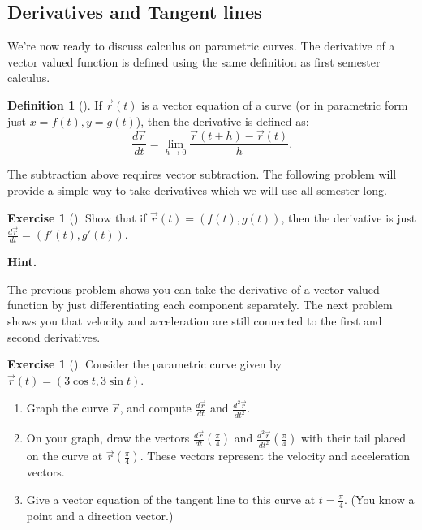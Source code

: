 \documentclass[10pt,]{book}
\theoremstyle{plain}
\theoremstyle{definition}
\newtheorem{definition}[theorem]{Definition}
\theoremstyle{definition}
\theoremstyle{definition}
\theoremstyle{definition}
\newtheorem{exploration}[project]{Exercise}
\theoremstyle{definition}
\numberwithin{equation}{section}
\newcommand{\ds}{\displaystyle}
\begin{document}
\subsection[{Derivatives and Tangent lines}]{Derivatives and Tangent lines}\label{sec_derivatives_and_tangent_lines}
We're now ready to discuss calculus on parametric curves. The derivative of a vector valued function is defined using the same definition as first semester calculus.%
\begin{definition}[{}]\label{definition-19}
If \(\vec r(t)\) is a vector equation of a curve (or in parametric form just \(x=f(t), y=g(t)\)), then the derivative is defined as:%
\begin{equation*}
\frac{d\vec r}{dt}=\ds\lim_{h\to 0}\frac{\vec r(t+h)-\vec r(t)}{h}.
\end{equation*}
%
\end{definition}
The subtraction above requires vector subtraction. The following problem will provide a simple way to take derivatives which we will use all semester long.%
\begin{exploration}[]\label{exploration-77}
Show that if \(\vec r(t) = (f(t),g(t))\), then the derivative is just \(\frac{d\vec r}{dt} = (f'(t),g'(t))\).%
\par\medskip\noindent%
\textbf{Hint.}\quad [The definition above says that \(\frac{d\vec r}{dt}=\ds\lim_{h\to 0}\frac{\vec r(t+h)-\vec r(t)}{h}\). We were told \(\vec r(t) = (f(t),g(t))\), so use this in the derivative definition. Then try to modify the equation to obtain \(\frac{d\vec r}{dt} = (f'(t),g'(t))\).]%
\end{exploration}
The previous problem shows you can take the derivative of a vector valued function by just differentiating each component separately. The next problem shows you that velocity and acceleration are still connected to the first and second derivatives.%
\begin{exploration}[]\label{exploration-78}
Consider the parametric curve given by \(\vec r(t)=( 3\cos t, 3\sin t )\).%
\begin{enumerate}[font=\bfseries,label=(\alph*),ref=\alph*]
\item\label{task-127} Graph the curve \(\vec r\), and compute \(\frac{d\vec r}{dt}\) and \(\frac{d^2\vec r}{dt^2}\).%
\item\label{task-128} On your graph, draw the vectors \(\frac{d\vec r}{dt}\left(\frac{\pi}{4}\right)\) and \(\frac{d^2\vec r}{dt^2}\left(\frac{\pi}{4}\right)\) with their tail placed on the curve at \(\vec r\left(\frac{\pi}{4}\right)\). These vectors represent the velocity and acceleration vectors.%
\item\label{task-129} Give a vector equation of the tangent line to this curve at \(t=\frac{\pi}{4}\). (You know a point and a direction vector.)%
\end{enumerate}
\end{exploration}
\end{document}
